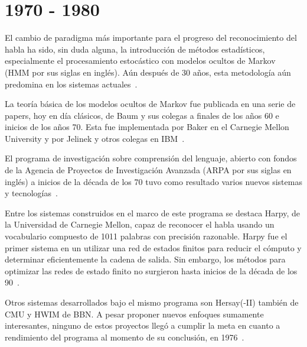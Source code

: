 \section{1970 - 1980}
\label{sec:70s}

El cambio de paradigma más importante para el progreso del reconocimiento del habla ha sido, sin duda alguna,
la introducción de métodos estadísticos, especialmente el procesamiento estocástico con modelos ocultos de
Markov (HMM por sus siglas en inglés). Aún después de 30 años, esta metodología aún predomina en los
sistemas \mbox{actuales \cite{BakerResearch2009}}.

La teoría básica de los modelos ocultos de Markov fue publicada en una serie de papers, hoy en día clásicos,
de Baum y sus colegas a finales de los años 60 e inicios de los años 70. Esta fue implementada por Baker en
el Carnegie Mellon University y por Jelinek y otros colegas en \mbox{IBM \cite{Rabiner89atutorial}}.

El programa de investigación sobre comprensión del lenguaje, abierto con fondos de la Agencia de Proyectos de Investigación Avanzada (ARPA por sus siglas en inglés) a inicios de la década de los 70 tuvo como 
resultado varios nuevos sistemas y \mbox{tecnologías \cite{Furui50Years2004}}.

Entre los sistemas construidos en el marco de este programa se destaca Harpy, de la Universidad de Carnegie Mellon,
capaz de reconocer el habla usando un vocabulario compuesto de 1011 palabras con precisión razonable. Harpy fue el
primer sistema en un utilizar una red de estados finitos para reducir el cómputo y determinar eficientemente la
cadena de salida. Sin embargo, los métodos para optimizar las redes de estado finito no surgieron hasta inicios de
la década de los \mbox{90 \cite{JuangAutomaticSpeech}}.

Otros sistemas desarrollados bajo el mismo programa son Hersay(-II) también de CMU y HWIM de BBN. A pesar proponer
nuevos enfoques sumamente interesantes, ninguno de estos proyectos llegó a cumplir la meta en cuanto a rendimiento
del programa al momento de su conclusión, en \mbox{1976 \cite{JuangAutomaticSpeech}}.



